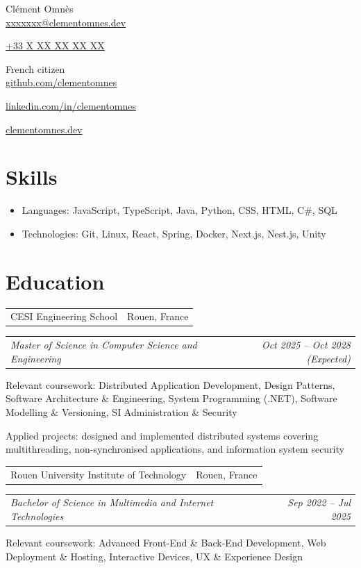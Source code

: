 \documentclass[a4paper,10pt]{article}
\makeatletter
\newcommand{\embd}[1]{{\fontseries{sb}\selectfont #1}}
\newcommand{\emsb}[1]{{\fontseries{sb}\selectfont #1}}
\newcommand{\iconWithText}[3][0.5em]{%
    \footnotesize\raisebox{0.1ex}{\scalebox{0.8}{#2}}\hspace{#1}#3%
}
\newcommand{\resumeEntry}[2]{%
    \begin{tabular*}{\textwidth}[t]{l@{\extracolsep{\fill}}r}%
        \embd{#1} & \small #2%
    \end{tabular*}%
}
\newcommand{\resumeRole}[3][]{%
    \begin{tabular*}{\textwidth}[t]{l@{\extracolsep{\fill}}r}%
        \embd{\textit{\small #2}}\ifstrempty{#1}{}{\small\embd{\ --\  #1}} & \textit{\small #3}%
    \end{tabular*}%
}
\newcommand{\resumeItemText}[1]{%
    {\small #1}\par%
}
\newcommand{\resumeDescListStart}{%
    \begin{itemize}[%
        leftmargin=0pt,%
        label={},%
        itemsep=2pt,%
        topsep=0pt,%
        partopsep=0pt,%
        parsep=0pt%
    ]%
}
\newcommand{\resumeDescListEnd}{\end{itemize}}
\newcommand{\resumeItemWithDesc}[2]{%
    \item{\emsb{\small #1}{\small : #2}}%
}
\newcommand{\sectionGap}{\vspace{6pt}}
\newcommand{\innerSectionGap}{\vspace{10pt}}
\makeatother
\begin{document}
\begin{center}
    {\Huge Clément Omnès} \\[0.5em]
    \iconWithText{\faEnvelope}{\href{mailto:xxxxxxx@clementomnes.dev}{xxxxxxx@clementomnes.dev}}
    \hspace{1.2em}
    \iconWithText{\faPhone}{\href{tel:+33XXXXXXXXX}{+33 X XX XX XX XX}}
    \hspace{1.2em}
    \iconWithText{\faFlag}{French citizen}\\[2pt]
    \iconWithText{\faGithub}{\href{https://github.com/clementomnes}{github.com/clementomnes}}
    \hspace{1.2em}
    \iconWithText{\faLinkedin}{\href{https://linkedin.com/in/clementomnes}{linkedin.com/in/clementomnes}}
    \hspace{1.2em}
    \iconWithText{\faGlobe}{\href{https://clementomnes.dev}{clementomnes.dev}}
\end{center}


\section{Skills}

\resumeDescListStart
    \resumeItemWithDesc{Languages}
        {JavaScript, TypeScript, Java, Python, CSS, HTML, C\#, SQL}
    \resumeItemWithDesc{Technologies}
        {Git, Linux, React, Spring, Docker, Next.js, Nest.js, Unity}
\resumeDescListEnd

\sectionGap


\section{Education}

\resumeEntry{CESI Engineering School}{Rouen, France}
\resumeRole[CGPA: X.X / 4.0]{Master of Science in Computer Science and Engineering}{Oct 2025 -- Oct 2028 (Expected)}
\resumeItemText{Relevant coursework: Distributed Application Development, Design Patterns, Software Architecture \& Engineering, System Programming (.NET), Software Modelling \& Versioning, SI Administration \& Security}
\resumeItemText{Applied projects: designed and implemented distributed systems covering multithreading, non-synchronised applications, and information system security}

\innerSectionGap

\resumeEntry{Rouen University Institute of Technology}{Rouen, France}
\resumeRole[CGPA: 3.7 / 4.0]{Bachelor of Science in Multimedia and Internet Technologies}{Sep 2022 -- Jul 2025}
\resumeItemText{Relevant coursework: Advanced Front-End \& Back-End Development, Web Deployment \& Hosting, Interactive Devices, UX \& Experience Design}
\end{document}
